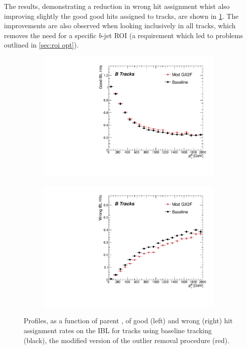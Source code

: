 The results, demonstrating a reduction in wrong hit assignment whist also improving slightly the good good hits assigned to tracks, are shown in \cref{fig:gx2f_opt_hits}. The improvements are also observed when looking inclusively in all tracks, which removes the need for a specific $b$-jet ROI (a requirement which led to problems outlined in \cref{sec:roi opt}).
%
\begin{figure}[!htbp]
    \centering
    \begin{subfigure}{.5\textwidth}
      \centering
      \includegraphics[width=\textwidth]{chapters/3.tracking/figs/p_nGoodHitsIBL_pTB_From_B.pdf}
    \end{subfigure}%
    \begin{subfigure}{.5\textwidth}
      \centering
      \includegraphics[width=\textwidth]{chapters/3.tracking/figs/p_nWrongHitsIBL_pTB_From_B.pdf}
    \end{subfigure}
    \caption{Profiles, as a function of parent \bhadron \pt, of good (left) and wrong (right) hit assignment rates on the IBL for tracks using baseline tracking (black), the modified version of the outlier removal procedure (red).}
    \label{fig:gx2f_opt_hits}
\end{figure}
